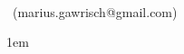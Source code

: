 
\begin{small}
\parindent 0pt
\meta \\ \autor\ (marius.gawrisch@gmail.com)
\end{small}
\vskip 1.0cm
\begin{center}\begin{Large}\titel\end{Large}\end{center}
\vskip 0.5cm

\parindent 1em
\onehalfspacing
